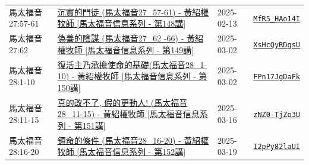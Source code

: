 \documentclass{book}
\begin{document}
{\begin{xltabular}{\textwidth}{|p{0.15\textwidth} p{0.6\textwidth}|p{0.07\textwidth} p{0.1\textwidth}|}
馬太福音 27:57-61 & \hyperref[sec:MfR5_HAo14I]{沉實的門徒  (馬太福音27\_57-61) - 黃紹權牧師  [馬太福音信息系列 - 第148講]} & 2025-02-13 & \href{https://youtube.com/watch?v=MfR5_HAo14I}{\texttt{MfR5\_HAo14I}} \\
馬太福音 27:62 & \hyperref[sec:XsHcQyRDgsU]{偽善的陰謀 (馬太福音27\_62 -66) - 黃紹權牧師  [馬太福音信息系列 - 第149講]} & 2025-03-02 & \href{https://youtube.com/watch?v=XsHcQyRDgsU}{\texttt{XsHcQyRDgsU}} \\
馬太福音 28:1-10 & \hyperref[sec:FPn17JgDaFk]{復活主乃承擔使命的基礎(馬太福音28\_1-10) - 黃紹權牧師  [馬太福音信息系列 - 第150講]} & 2025-03-02 & \href{https://youtube.com/watch?v=FPn17JgDaFk}{\texttt{FPn17JgDaFk}} \\
馬太福音 28:11-15 & \hyperref[sec:zNZ0_TjZo3U]{真的改不了, 假的更動人! (馬太福音28\_11-15) - 黃紹權牧師  [馬太福音信息系列 - 第151講]} & 2025-03-16 & \href{https://youtube.com/watch?v=zNZ0-TjZo3U}{\texttt{zNZ0-TjZo3U}} \\
馬太福音 28:16-20 & \hyperref[sec:I2pPy82laUI]{領命的條件 (馬太福音28\_16-20) - 黃紹權牧師  [馬太福音信息系列 - 第152講]} & 2025-03-19 & \href{https://youtube.com/watch?v=I2pPy82laUI}{\texttt{I2pPy82laUI}} \\
\hline
\end{xltabular}
}
\newpage
\end{document}
